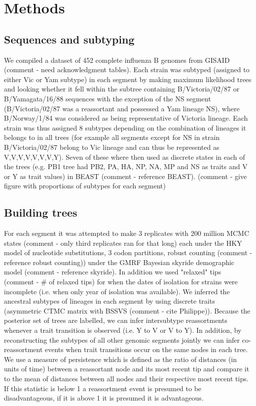 \documentclass[11pt,oneside,letterpaper]{article}
\begin{document}
\section*{Methods}

\subsection*{Sequences and subtyping}
We compiled a dataset of 452 complete influenza B genomes from GISAID (comment - need acknowledgment tables). 
Each strain was subtyped (assigned to either Vic or Yam subtype) in each segment by making maximum likelihood trees and looking whether it fell within the subtree containing B/Victoria/02/87 or B/Yamagata/16/88 sequences with the exception of the NS segment (B/Victoria/02/87 was a reassortant and possessed a Yam lineage NS), where B/Norway/1/84 was considered as being representative of Victoria lineage.
Each strain was thus assigned 8 subtypes depending on the combination of lineages it belongs to in all trees (for example all segments except for NS in strain B/Victoria/02/87 belong to Vic lineage and can thus be represented as V,V,V,V,V,V,V,Y). 
Seven of these where then used as discrete states in each of the trees (e.g. PB1 tree had PB2, PA, HA, NP, NA, MP and NS as traits and V or Y as trait values) in BEAST (comment - reference BEAST). (comment - give figure with proportions of subtypes for each segment)

\subsection*{Building trees}
For each segment it was attempted to make 3 replicates with 200 million MCMC states (comment - only third replicates ran for that long) each under the HKY model of nucleotide substitutions, 3 codon partitions, robust counting (comment - reference robust counting)) under the GMRF Bayesian skyride demographic model (comment - reference skyride).
In addition we used "relaxed" tips (comment - \# of relaxed tips) for when the dates of isolation for strains were incomplete (i.e. when only year of isolation was available).
We inferred the ancestral subtypes of lineages in each segment by using discrete traits (asymmetric CTMC matrix with BSSVS (comment - cite Philippe)). Because the posterior set of trees are labelled, we can infer intersubtype reassortments whenever a trait transition is observed (i.e. Y to V or V to Y). 
In addition, by reconstructing the subtypes of all other genomic segments jointly we can infer co-reassortment events when trait transitions occur on the same nodes in each tree.
We use a measure of persistence which is defined as the ratio of distances (in units of time) between a reassortant node and its most recent tip and compare it to the mean of distances between all nodes and their respective most recent tips. 
If this statistic is below 1 a reassortment event is presumed to be disadvantageous, if it is above 1 it is presumed it is advantageous.
\end{document}
